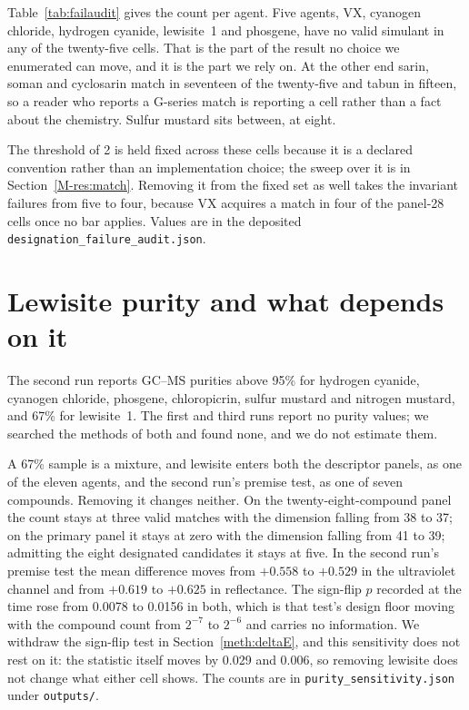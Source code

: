 \documentclass[11pt,a4paper]{article}
\begin{document}
Table~\ref{tab:failaudit} gives the count per agent. Five agents, VX, cyanogen
chloride, hydrogen cyanide, lewisite~1 and phosgene, have no valid simulant in
any of the twenty-five cells. That is the part of the result no choice we
enumerated can move, and it is the part we rely on. At the other end sarin,
soman and cyclosarin match in seventeen of the twenty-five and tabun in
fifteen, so a reader who reports a G-series match is reporting a cell rather
than a fact about the chemistry. Sulfur mustard sits between, at eight.

The threshold of 2 is held fixed across these cells because it is a declared
convention rather than an implementation choice; the sweep over it is in
Section~\ref{M-res:match}. Removing it from the fixed set as well takes the
invariant failures from five to four, because VX acquires a match in four of
the panel-28 cells once no bar applies. Values are in the deposited
\texttt{designation\_failure\_audit.json}.

\begin{table}[htbp]
\centering
\caption{Agents with a valid simulant across the twenty-five enumerated
analyst choices (three readings of the comparison set, two correlation
filters, three panels, and the seven sparse-indicator encodings of
Table~\ref{tab:sparse}). The threshold of 2 is held fixed.}
\label{tab:failaudit}
\small

\end{table}

\section{Lewisite purity and what depends on it}
\label{meth:purity}

The second run reports GC--MS purities above 95\% for hydrogen cyanide,
cyanogen chloride, phosgene, chloropicrin, sulfur mustard and nitrogen
mustard, and 67\% for lewisite~1.\cite{multiplexref} The first and third runs
report no purity values; we searched the methods of both and found none, and we
do not estimate them.

A 67\% sample is a mixture, and lewisite enters both the descriptor panels, as
one of the eleven agents, and the second run's premise test, as one of seven
compounds. Removing it changes neither. On the twenty-eight-compound panel the
count stays at three valid matches with the dimension falling from 38 to 37; on
the primary panel it stays at zero with the dimension falling from 41 to 39;
admitting the eight designated candidates it stays at five. In the second run's
premise test the mean difference moves from $+0.558$ to $+0.529$ in the
ultraviolet channel and from $+0.619$ to $+0.625$ in reflectance. The
sign-flip $p$ recorded at the time rose from 0.0078 to 0.0156 in both, which
is that test's design floor moving with the compound count from $2^{-7}$ to
$2^{-6}$ and carries no information. We withdraw the sign-flip test in
Section~\ref{meth:deltaE}, and this sensitivity does not rest on it: the
statistic itself moves by 0.029 and 0.006, so removing lewisite does not
change what either cell shows. The counts are in \texttt{purity\_sensitivity.json} under
\texttt{outputs/}.
\end{document}
